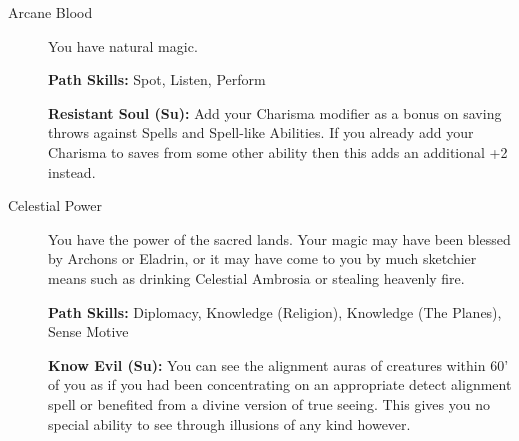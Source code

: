 \begin{description}
\item[Arcane Blood] You have natural magic.

\textbf{Path Skills:} Spot, Listen, Perform

\textbf{Resistant Soul (Su):} Add your Charisma modifier as a bonus on saving throws against Spells and Spell-like Abilities. If you already add your Charisma to saves from some other ability then this adds an additional +2 instead.


\item[Celestial Power] You have the power of the sacred lands. Your magic may have been blessed by Archons or Eladrin, or it may have come to you by much sketchier means such as drinking Celestial Ambrosia or stealing heavenly fire.

\textbf{Path Skills:} Diplomacy, Knowledge (Religion), Knowledge (The Planes), Sense Motive

\textbf{Know Evil (Su):} You can see the alignment auras of creatures within 60' of you as if you had been concentrating on an appropriate detect alignment spell or benefited from a divine version of true seeing. This gives you no special ability to see through illusions of any kind however.


\end{description}
